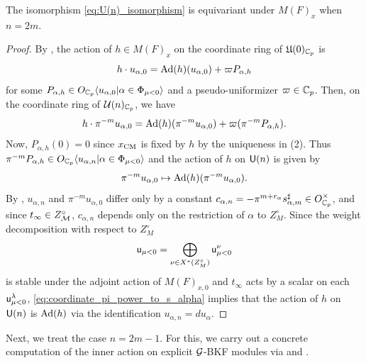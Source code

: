 \documentclass[12pt,reqno]{amsart}
\begin{document}
\begin{prop} \label{prop:equivariance_reduction_even}
    The isomorphism \eqref{eq:U(n)_isomorphism} is equivariant under $M(F)_x$ when $n = 2m$. 
\end{prop}
\begin{proof}
    By , the action of $h \in M(F)_x$ on the coordinate ring of ${\mathfrak{U}}(0)_{\mathbb{C}_p}$ is 
    \[
        h \cdot u_{\alpha, 0} = {\operatorname{Ad}}(h)(u_{\alpha, 0}) + \varpi P_{\alpha, h}
    \]
    for some $P_{\alpha, h} \in O_{\mathbb{C}_p} \langle u_{\alpha, 0} \vert \alpha \in \Phi_{\mu < 0} \rangle$ and a pseudo-uniformizer $\varpi \in \mathbb{C}_p$. Then, on the coordinate ring of ${\mathcal{U}}(n)_{\mathbb{C}_p}$, we have
    \[
        h \cdot \pi^{-m} u_{\alpha, 0} = {\operatorname{Ad}}(h)(\pi^{-m}u_{\alpha, 0}) + \varpi (\pi^{-m} P_{\alpha, h}). 
    \]
    Now, $P_{\alpha, h}(0) = 0$ since $x_{\operatorname{CM}}$ is fixed by $h$ by the uniqueness in  (2). Thus $\pi^{-m} P_{\alpha, h} \in O_{\mathbb{C}_p} \langle u_{\alpha, n} \vert \alpha \in \Phi_{\mu < 0} \rangle$ and the action of $h$ on ${\mathsf{U}}(n)$ is given by 
    \begin{equation} \label{eq:coordinate_pi_power_to_s_alpha}
        \pi^{-m} u_{\alpha, 0} \mapsto {\operatorname{Ad}}(h)(\pi^{-m}u_{\alpha, 0}).
    \end{equation}
    By , $u_{\alpha, n}$ and $\pi^{-m}u_{\alpha, 0}$ differ only by a constant $c_{\alpha, n} = - \pi^{m + r_\alpha} s^\sharp_{\alpha, m} \in O_{\mathbb{C}_p}^\times$, and since $t_\infty \in Z_{{\mathcal{M}}}^\circ$, $c_{\alpha, n}$ depends only on the restriction of $\alpha$ to $Z_M^\circ$. Since the weight decomposition with respect to $Z_M^\circ$ 
    \[
        {\mathsf{u}}_{\mu < 0} = \bigoplus_{\nu \in X^*(Z_M^\circ)} {\mathsf{u}}_{\mu < 0}^\nu
    \]
    is stable under the adjoint action of $M(F)_{x, 0}$ and $t_\infty$ acts by a scalar on each ${\mathsf{u}}_{\mu < 0}^\lambda$, \eqref{eq:coordinate_pi_power_to_s_alpha} implies that the action of $h$ on ${\mathsf{U}}(n)$ is ${\operatorname{Ad}}(h)$ via the identification $u_{\alpha, n} = du_\alpha$. 
\end{proof}

Next, we treat the case $n = 2m - 1$. For this, we carry out a concrete computation of the inner action on explicit ${\mathcal{G}}$-BKF modules via  and \cite[Proposition 2.15]{Tak25z}. 
\end{document}
